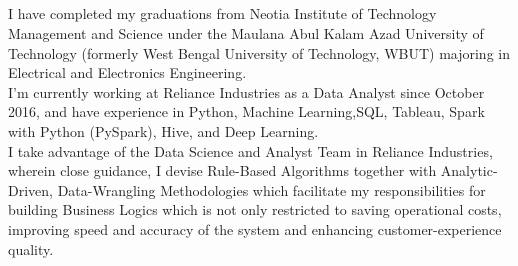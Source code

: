 \documentclass[11pt, a4paper]{article}
\begin{document}
	\begin{center}
		\textcolor{dBlue}{{\HeaderNFont \AuthorFName}\hspace{0.7cm}{\HeaderNFont \AuthorLName}} \\
		\vspace{2pt}
		{\small \textcolor{dBlue}{\CyberPresence}}
		\vspace{-23pt}
	\end{center}
	
	\textcolor{dBlue}{
		\\ \noindent\makebox[\linewidth]{\rule{\textwidth}{2.1pt}}
		\vspace{-21pt} \\
		\noindent\makebox[\linewidth]{\rule{\paperwidth}{3.9pt}}
		\vspace{-13pt} \\
	}
	
	
	
	I have completed my graduations from Neotia Institute of Technology Management and Science under the Maulana Abul Kalam Azad University of Technology (formerly West Bengal University of Technology, WBUT) majoring in Electrical and Electronics Engineering. \\[5pt]
	
	I'm currently working at Reliance Industries as a Data Analyst since October 2016, and have experience in Python, Machine Learning,SQL, Tableau, Spark with Python (PySpark), Hive, and Deep Learning. \\[5pt]
	
	I take advantage of the Data Science and Analyst Team in Reliance Industries, wherein close guidance, I devise Rule-Based Algorithms together with Analytic-Driven, Data-Wrangling Methodologies which facilitate my responsibilities for building Business Logics which is not only restricted to saving operational costs, improving speed and accuracy of the system and enhancing customer-experience quality. \\[5pt]
	
\end{document}
